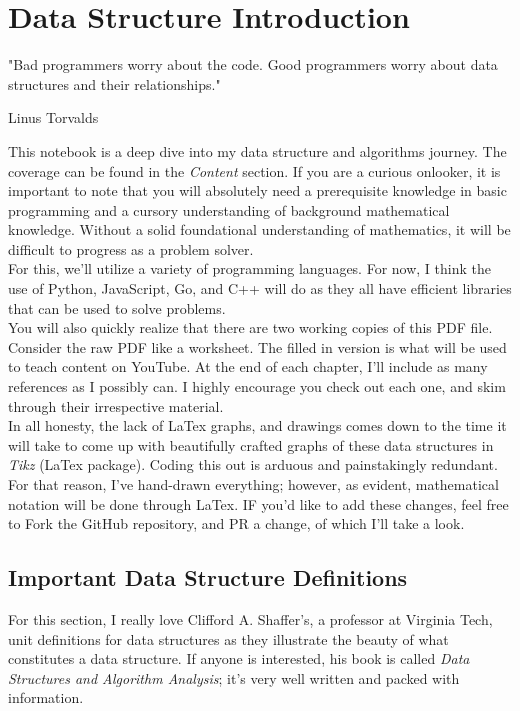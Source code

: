 \frenchspacing
\chapter{Data Structure Introduction}
\epigraph{"Bad programmers worry about the code. Good programmers worry about data structures and their relationships."}{Linus Torvalds}

This notebook is a deep dive into my data structure and algorithms journey. The coverage can be found in the \textit{Content} section. If you are a curious onlooker, it is important to note that you will absolutely need a prerequisite knowledge in basic programming and a cursory understanding of background mathematical knowledge. Without a solid foundational understanding of mathematics, it will be difficult to progress as a problem solver. 
\\

For this, we'll utilize a variety of programming languages. For now, I think the use of Python, JavaScript, Go, and C++ will do as they all have efficient libraries that can be used to solve problems.
\\

You will also quickly realize that there are two working copies of this PDF file. Consider the raw PDF like a worksheet. The filled in version is what will be used to teach content on YouTube. At the end of each chapter, I'll include as many references as I possibly can. I highly encourage you check out each one, and skim through their irrespective material. 
\\
    
In all honesty, the lack of LaTex graphs, and drawings comes down to the time it will take to come up with beautifully crafted graphs of these data structures in \textit{Tikz} (LaTex package). Coding this out is arduous and painstakingly redundant. For that reason, I've hand-drawn everything; however, as evident, mathematical notation will be done through LaTex. IF you'd like to add these changes, feel free to Fork the GitHub repository, and PR a change, of which I'll take a look.

\section{Important Data Structure Definitions}

For this section, I really love Clifford A. Shaffer's, a professor at Virginia Tech, unit definitions for data structures as they illustrate the beauty of what constitutes a data structure. If anyone is interested, his book is called \textit{Data Structures and Algorithm Analysis}; it's very well written and packed with information. 
\\

